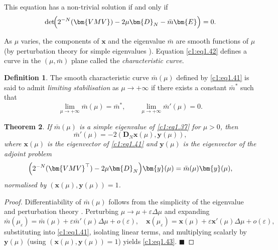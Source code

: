 \documentclass[12pt]{report}
\newcommand{\bs}[1]{\bm{#1}}
\newtheorem{theorem}{Theorem}[section]
\theoremstyle{definition}
\newtheorem{definition}[theorem]{Definition}
\theoremstyle{remark}
\begin{document}
This equation has a non-trivial solution if and only if
\begin{equation}
  \det\!\Bigl(2^{-N}(\bs{VMV})-2\mu\bs{D}_N-\bar{m}\bs{E}\Bigr)=0.
  \label{c1:eq1.42}
\end{equation}

As $\mu$ varies, the components of $\bs{x}$ and the eigenvalue
$\bar{m}$ are smooth functions of $\mu$ (by perturbation theory
for simple eigenvalues \cite{c1:Kato1976}).  Equation \eqref{c1:eq1.42}
defines a curve in the $(\mu,\bar{m})$ plane called the
\emph{characteristic curve}.

\begin{definition}
The smooth characteristic curve $\bar{m}(\mu)$ defined by
\eqref{c1:eq1.41} is said to admit \emph{limiting stabilisation} as
$\mu\to+\infty$ if there exists a constant $\bar{m}^*$ such that
\[
  \lim_{\mu\to+\infty}\bar{m}(\mu)=\bar{m}^*,\qquad
  \lim_{\mu\to+\infty}\bar{m}'(\mu)=0.
\]
\end{definition}

\begin{theorem}
If $\bar{m}(\mu)$ is a simple eigenvalue of \eqref{c1:eq1.37} for
$\mu>0$, then
\begin{equation}
  \bar{m}'(\mu)=-2(\bs{D}_N\bs{x}(\mu),\bs{y}(\mu)),
  \label{c1:eq1.43}
\end{equation}
where $\bs{x}(\mu)$ is the eigenvector of \eqref{c1:eq1.41} and
$\bs{y}(\mu)$ is the eigenvector of the adjoint problem
\begin{equation}
  \Bigl(2^{-N}(\bs{VMV}^{\top})-2\mu\bs{D}_N\Bigr)\bs{y}(\mu)
  =\bar{m}(\mu)\bs{y}(\mu),
  \label{c1:eq1.44}
\end{equation}
normalised by $(\bs{x}(\mu),\bs{y}(\mu))=1$.
\end{theorem}

\begin{proof}
Differentiability of $\bar{m}(\mu)$ follows from the simplicity of
the eigenvalue and perturbation theory \cite{c1:Kato1976}.
Perturbing $\mu\to\mu+\varepsilon\Delta\mu$ and expanding
\begin{equation}
  \bar{m}(\mu_\varepsilon)=\bar{m}(\mu)+\varepsilon\bar{m}'(\mu)\Delta\mu+o(\varepsilon),\quad
  \bs{x}(\mu_\varepsilon)=\bs{x}(\mu)+\varepsilon\bs{x}'(\mu)\Delta\mu+o(\varepsilon),
  \label{c1:eq1.46}
\end{equation}
substituting into \eqref{c1:eq1.41}, isolating linear terms, and
multiplying scalarly by $\bs{y}(\mu)$ (using
$(\bs{x}(\mu),\bs{y}(\mu))=1$) yields \eqref{c1:eq1.43}.
\hfill$\blacksquare$
\end{proof}
\end{document}
